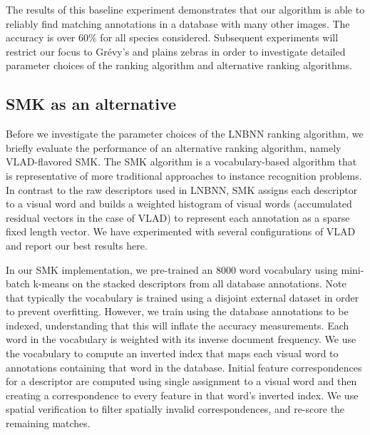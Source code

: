         The results of this baseline experiment demonstrates that our algorithm is able to reliably find matching
        annotations in a database with many other images. The accuracy is over $60\percent$ for all species
        considered. Subsequent experiments will restrict our focus to Grévy's and plains zebras in order to
        investigate detailed parameter choices of the ranking algorithm and alternative ranking algorithms.
      
        \BaselineExpt{}

    \FloatBarrier{}
    \subsection{SMK as an alternative}\label{sub:exptsmk}  

        Before we investigate the parameter choices of the LNBNN ranking algorithm, we briefly evaluate the
        performance of an alternative ranking algorithm, namely VLAD-flavored SMK. The SMK algorithm is a
        vocabulary-based algorithm that is representative of more traditional approaches to instance recognition
        problems. In contrast to the raw descriptors used in LNBNN, SMK assigns each descriptor to a visual word
        and builds a weighted histogram of visual words (accumulated residual vectors in the case of VLAD) to
        represent each annotation as a sparse fixed length vector. We have experimented with several configurations
        of VLAD and report our best results here.

        In our SMK implementation, we pre-trained an $8000$ word vocabulary using mini-batch k-means on the stacked
        descriptors from all database annotations. Note that typically the vocabulary is trained using a disjoint
        external dataset in order to prevent overfitting. However, we \naively{} train using the database
        annotations to be indexed, understanding that this will inflate the accuracy measurements. Each word in the
        vocabulary is weighted with its inverse document frequency. We use the vocabulary to compute an inverted
        index that maps each visual word to annotations containing that word in the database. Initial feature
        correspondences for a descriptor are computed using single assignment to a visual word and then creating a
        correspondence to every feature in that word's inverted index. We use spatial verification to filter
        spatially invalid correspondences, and re-score the remaining matches.

